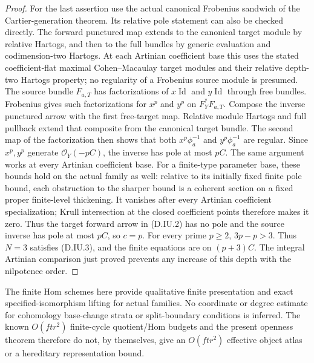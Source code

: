 \begin{proof}
For the last assertion use the actual canonical Frobenius
sandwich of the Cartier-generation theorem. Its relative
pole statement can also be checked directly. The forward
punctured map extends to the canonical target module by
relative Hartogs, and then to the full bundles by generic
evaluation and codimension-two Hartogs. At each Artinian
coefficient base this uses the stated coefficient-flat maximal
Cohen--Macaulay target modules and their relative depth-two
Hartogs property; no regularity of a Frobenius source module
is presumed. The source bundle
$F_{a,T}$ has factorizations of $x\operatorname{Id}$ and
$y\operatorname{Id}$ through free bundles. Frobenius gives
such factorizations for $x^p$ and $y^p$ on $F_Y^*F_{a,T}$.
Compose the inverse punctured arrow with the first free-target
map. Relative module Hartogs and full pullback extend that
composite from the canonical target bundle. The second map
of the factorization then shows that both $x^p\phi_a^{-1}$
and $y^p\phi_a^{-1}$ are regular. Since $x^p,y^p$ generate
$\mathcal O_Y(-pC)$, the inverse has pole at most $pC$.
The same argument works at every Artinian coefficient base.
For a finite-type parameter base, these bounds hold on the
actual family as well: relative to its initially fixed finite
pole bound, each obstruction to the sharper bound is a
coherent section on a fixed proper finite-level thickening.
It vanishes after every Artinian coefficient specialization;
Krull intersection at the closed coefficient points therefore
makes it zero. Thus the target
forward arrow in (D.IU.2) has no pole and the source inverse
has pole at most $pC$, so $c=p$. For every prime $p\ge2$,
$3p-p>3$. Thus $N=3$ satisfies (D.IU.3), and the finite
equations are on $(p+3)C$. The integral Artinian comparison
just proved prevents any increase of this depth with the
nilpotence order.
\end{proof}

\begin{remark}
The finite Hom schemes here provide qualitative finite
presentation and exact specified-isomorphism lifting for
actual families. No coordinate or degree estimate for
cohomology base-change strata or split-boundary conditions
is inferred. The known $O(ftr^2)$ finite-cycle quotient/Hom
budgets and the present openness theorem therefore do not,
by themselves, give an $O(ftr^2)$ effective object atlas or
a hereditary representation bound.
\end{remark}
